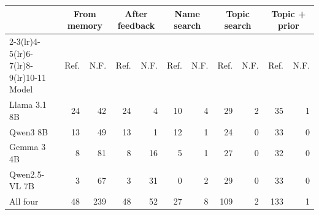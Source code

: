 \begin{tabular}{lrrrrrrrrrr}
\toprule
 & \multicolumn{2}{c}{From memory} & \multicolumn{2}{c}{After feedback} & \multicolumn{2}{c}{Name search} & \multicolumn{2}{c}{Topic search} & \multicolumn{2}{c}{Topic + prior} \\
\cmidrule(lr){2-3}\cmidrule(lr){4-5}\cmidrule(lr){6-7}\cmidrule(lr){8-9}\cmidrule(lr){10-11}
Model & Ref. & N.F. & Ref. & N.F. & Ref. & N.F. & Ref. & N.F. & Ref. & N.F. \\
\midrule
Llama 3.1 8B & 24 & 42 & 24 & 4 & 10 & 4 & 29 & 2 & 35 & 1 \\
Qwen3 8B & 13 & 49 & 13 & 1 & 12 & 1 & 24 & 0 & 33 & 0 \\
Gemma 3 4B & 8 & 81 & 8 & 16 & 5 & 1 & 27 & 0 & 32 & 0 \\
Qwen2.5-VL 7B & 3 & 67 & 3 & 31 & 0 & 2 & 29 & 0 & 33 & 0 \\
\midrule
All four & 48 & 239 & 48 & 52 & 27 & 8 & 109 & 2 & 133 & 1 \\
\bottomrule
\end{tabular}
